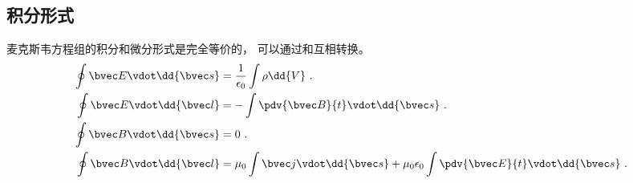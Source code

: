 \subsection{积分形式}
麦克斯韦方程组的积分和微分形式是完全等价的， 可以通过和互相转换。
\begin{align}
\oint \bvec E \vdot \dd{\bvec s} &= \frac{1}{\epsilon_0}\int \rho \dd{V}~.\\
\oint \bvec E \vdot \dd{\bvec l} &= -\int \pdv{\bvec B}{t} \vdot \dd{\bvec s}~.\\
\oint \bvec B \vdot \dd{\bvec s} &= 0~.\\
\oint \bvec B \vdot \dd{\bvec l} &= \mu_0 \int \bvec j \vdot \dd{\bvec s} + \mu_0 \epsilon_0 \int \pdv{\bvec E}{t} \vdot \dd{\bvec s}~.
\end{align}
